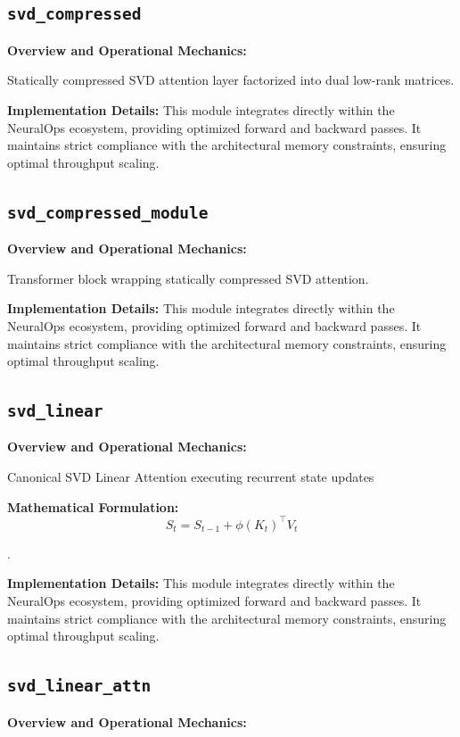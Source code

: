 \documentclass[10pt,twocolumn,letterpaper]{article}
\begin{document}
\subsection{\texttt{svd\_compressed}}
\textbf{Overview and Operational Mechanics:}

Statically compressed SVD attention layer factorized into dual low-rank matrices.

\textbf{Implementation Details:}
This module integrates directly within the NeuralOps ecosystem, providing optimized forward and backward passes. It maintains strict compliance with the architectural memory constraints, ensuring optimal throughput scaling.

\subsection{\texttt{svd\_compressed\_module}}
\textbf{Overview and Operational Mechanics:}

Transformer block wrapping statically compressed SVD attention.

\textbf{Implementation Details:}
This module integrates directly within the NeuralOps ecosystem, providing optimized forward and backward passes. It maintains strict compliance with the architectural memory constraints, ensuring optimal throughput scaling.

\subsection{\texttt{svd\_linear}}
\textbf{Overview and Operational Mechanics:}

Canonical SVD Linear Attention executing recurrent state updates

\textbf{Mathematical Formulation:}
\begin{equation}
S_t = S_{t-1} + \phi(K_t)^\top V_t
\end{equation}

.

\textbf{Implementation Details:}
This module integrates directly within the NeuralOps ecosystem, providing optimized forward and backward passes. It maintains strict compliance with the architectural memory constraints, ensuring optimal throughput scaling.

\subsection{\texttt{svd\_linear\_attn}}
\textbf{Overview and Operational Mechanics:}
\end{document}
